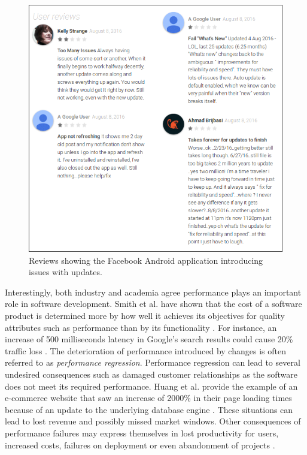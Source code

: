 \begin{figure}[h]
	\centering
	\includegraphics[width=\linewidth]{introduction/images/bad_reviews.png}
	\caption{Reviews showing the Facebook Android application introducing issues with updates.}
	\label{fig:facebook_bad_reviews}
\end{figure}

Interestingly, both industry and academia agree performance plays an important role in software development.
Smith et al. have shown that the cost of a software product is determined more by how well it achieves its objectives for quality attributes such as performance than by its functionality \cite{smith2003software}.
For instance, an increase of 500 milliseconds latency in Google's search results could cause 20\% traffic loss \cite{mayer2009search}.  
The deterioration of performance introduced by changes is often referred to as \emph{performance regression}.
Performance regression can lead to several undesired consequences such as damaged customer relationships as the software does not meet its required performance.
Huang et al. provide the example of an e-commerce website that saw an increase of 2000\% in their page loading times because of an update to the underlying database engine \cite{huang2014performance}.
These situations can lead to lost revenue and possibly missed market windows.
Other consequences of performance failures may express themselves in lost productivity for users, increased costs, failures on deployment or even abandonment of projects \cite{woodside2007future, williams1998performance}.

